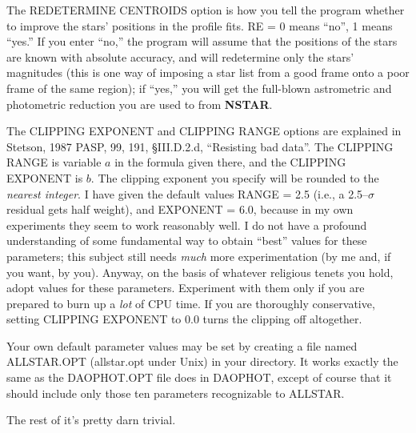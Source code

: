 The REDETERMINE CENTROIDS option is how you tell the program whether
to improve the stars' positions in the profile fits.  RE = 0 means
``no'', 1 means ``yes.''  If you enter ``no,'' the program will
assume that the positions of the stars are known with absolute
accuracy, and will redetermine only the stars' magnitudes (this is
one way of imposing a star list from a good frame onto a poor frame
of the same region); if ``yes,'' you will get the full-blown 
astrometric and photometric reduction you are used to from {\bf NSTAR}.

The CLIPPING EXPONENT and CLIPPING RANGE options are explained in
Stetson, 1987 PASP, 99, 191, \S III.D.2.d, ``Resisting bad data''.  The
CLIPPING RANGE is variable $a$ in the formula given there, and the
CLIPPING EXPONENT is $b$.  The clipping exponent you specify will be
rounded to the {\it nearest integer\/}.  I have given the default
values RANGE = 2.5 (i.e., a 2.5--$\sigma$ residual gets half weight),
and EXPONENT = 6.0, because in my own experiments they seem to work
reasonably well. I do not have a profound understanding of some
fundamental way to obtain ``best'' values for these parameters; this
subject still needs {\it much\/} more experimentation (by me and, if
you want, by you).  Anyway, on the basis of whatever religious tenets
you hold, adopt values for these parameters. Experiment with them only
if you are prepared to burn up a {\it lot\/} of CPU time.  If you are
thoroughly conservative, setting CLIPPING EXPONENT to 0.0 turns the
clipping off altogether.

Your own default parameter values may be set by creating a file named
ALLSTAR.OPT (allstar.opt under Unix) in your directory.  It works
exactly the same as the DAOPHOT.OPT file does in DAOPHOT, except of
course that it should include only those ten parameters recognizable to
ALLSTAR.

\vfill
\eject
The rest of it's pretty darn trivial.


